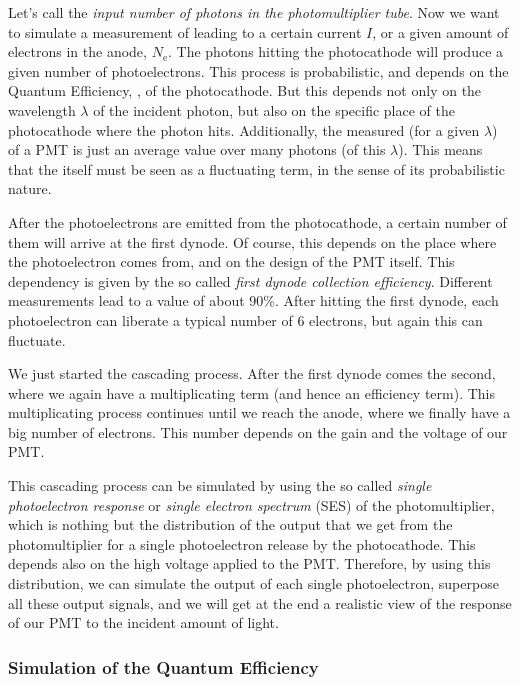 Let's call \Nphot the \emph{input number of photons in the
  photomultiplier tube}. Now we want to simulate a measurement of
\Nphot leading to a certain current $I$, or a given amount of
electrons in the anode, $N_{\mathrm{e}}$. The \Cherenkov photons
hitting the photocathode will produce a given number of
photoelectrons. This process is probabilistic, and depends on the
Quantum Efficiency, \QE, of the photocathode.  But this \QE depends
not only on the wavelength $\lambda$ of the incident photon, but also
on the specific place of the photocathode where the photon hits.
Additionally, the measured \QE (for a given $\lambda$) of a PMT is
just an average value over many photons (of this $\lambda$). This
means that the \QE itself must be seen as a fluctuating term, in the
sense of its probabilistic nature.

After the photoelectrons are emitted from the photocathode, a certain
number of them will arrive at the first dynode. Of course, this
depends on the place where the photoelectron comes from, and on the
design of the PMT itself. This dependency is given by the so called
\emph{first dynode collection efficiency}. Different measurements lead
to a value of about 90\%. After hitting the first dynode, each
photoelectron can liberate a typical number of 6 electrons, but again
this can fluctuate.

We just started the cascading process. After the first dynode comes
the second, where we again have a multiplicating term (and hence an
efficiency term). This multiplicating process continues until we reach
the anode, where we finally have a big number of electrons. This
number depends on the gain and the voltage of our PMT.

This cascading process can be simulated by using the so called
\emph{single photoelectron response} or \emph{single electron
  spectrum} (SES) of the photomultiplier, which is nothing but the
distribution of the output that we get from the photomultiplier for a
single photoelectron release by the photocathode. This depends also on
the high voltage applied to the PMT. Therefore, by using this
distribution, we can simulate the output of each single photoelectron,
superpose all these output signals, and we will get at the end a
realistic view of the response of our PMT to the incident amount of
light.

\subsubsection{Simulation of the Quantum Efficiency}

